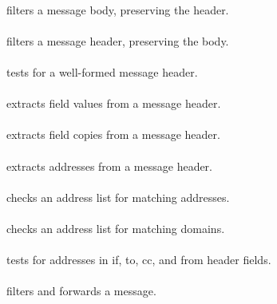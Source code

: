 \documentclass{book}
\begin{document}
\paragraph{} filters a message body, preserving the header.

\paragraph{} filters a message header, preserving the body.

\paragraph{} tests for a well-formed message header.

\paragraph{} extracts field values from a message header.

\paragraph{} extracts field copies from a message header.

\paragraph{} extracts addresses from a message header.

\paragraph{} checks an address list for matching addresses.

\paragraph{} checks an address list for matching domains.

\paragraph{} tests for addresses in if, to, cc, and from header fields.

\paragraph{} filters and forwards a message.
\end{document}
